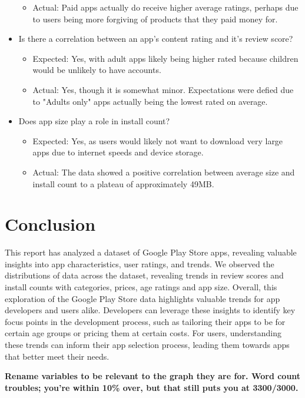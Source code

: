 \documentclass[12pt]{report}\usepackage[]{graphicx}\usepackage[]{xcolor}
\begin{document}
\begin{itemize}
\begin{itemize}
        \item Actual: Paid apps actually do receive higher average ratings, perhaps due to users being more
                      forgiving of products that they paid money for.
    \end{itemize}
    \item Is there a correlation between an app's content rating and it's review score?
    \begin{itemize}
        \item Expected: Yes, with adult apps likely being higher rated because children
        would be unlikely to have accounts.
        \item Actual: Yes, though it is somewhat minor. Expectations were defied due to "Adults only" apps
                      actually being the lowest rated on average.
    \end{itemize}
    \item Does app size play a role in install count?
    \begin{itemize}
        \item Expected: Yes, as users would likely not want to download very large
        apps due to internet speeds and device storage.
        \item Actual: The data showed a positive correlation between average size and install count to a plateau of approximately 49MB.
    \end{itemize}
\end{itemize}

\section{Conclusion}

This report has analyzed a dataset of Google Play Store apps,
revealing valuable insights into app characteristics, user ratings, and trends. 
We observed the distributions of data across the dataset, revealing trends in 
review scores and install counts with categories, prices, age ratings and app size.
Overall, this exploration of the Google Play Store data highlights valuable trends
for app developers and users alike. Developers can leverage these insights to 
identify key focus points in the development process, such as tailoring their apps to be for certain age 
groups or pricing them at certain costs. For users, understanding these
trends can inform their app selection process, leading them towards apps that better meet their needs.


\large\textbf{Rename variables to be relevant to the graph they are for. Word count troubles; 
you're within 10\% over, but that still puts you at 3300/3000.}\normalsize

\printbibliography{}
\end{document}

